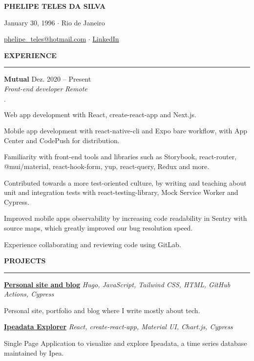 \documentclass[11pt,letterpaper]{article}
\newenvironment{tightlist}
  {\begin{list}
    {$\cdot$}
    {
      \setlength{\leftmargin}{0em}
      \setlength{\itemsep}{-\smallskipamount}
    }
  }
{\end{list}}
\begin{document}
\pagestyle{empty}

\centerline{\huge\bf PHELIPE TELES DA SILVA}
\medskip

\centerline{January 30, 1996 $\cdot$ Rio de Janeiro}
\smallskip

\centerline{
  \href{mailto:phelipe_teles@hotmail.com}{phelipe\_teles@hotmail.com}
  $\cdot$
  \href{https://linkedin.com/in/phelipeteles}{LinkedIn}
}
\smallskip

\medskip \textbf{EXPERIENCE} \medskip
\hrule

\textbf{Mutual} \hfill Dez. 2020 -- Present \\
\emph{Front-end developer} \hfill \emph{Remote} {\parfillskip=0pt\par}

\begin{tightlist}
  \item Web app development with React, create-react-app and Next.js.
  \item Mobile app development with react-native-cli and Expo bare workflow,
    with App Center and CodePush for distribution.
  \item Familiarity with front-end tools and libraries such as Storybook,
    react-router, @mui/material, react-hook-form, yup, react-query, Redux and
    more.
  \item Contributed towards a more test-oriented culture, by writing and
    teaching about unit and integration tests with react-testing-library,
    Mock Service Worker and Cypress.
  \item Improved mobile apps observability by increasing code readability in
    Sentry with source maps, which greatly improved our bug resolution speed.
  \item Experience collaborating and reviewing code using GitLab.
\end{tightlist}

\medskip \textbf{PROJECTS} \medskip
\hrule

\textbf{\href{https://phelipetls.github.io}{Personal site and blog}} \hfill \emph{Hugo, JavaScript, Tailwind CSS, HTML, GitHub Actions, Cypress}
{\parfillskip=0pt\par}
Personal site, portfolio and blog where I write mostly about tech.

\smallskip

\textbf{\href{http://ipeadata-explorer.surge.sh}{Ipeadata Explorer}} \hfill \emph{React, create-react-app, Material UI, Chart.js, Cypress}
{\parfillskip=0pt\par}
Single Page Application to visualize and explore Ipeadata, a time series database maintained by Ipea.
\end{document}
